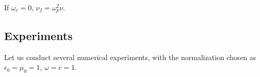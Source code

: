 \documentclass[a4paper,10pt]{article}
\begin{document}
If $\omega_c=0$, $\nu_f=\omega_p^2\nu$.













\subsection{Experiments}
Let us conduct several numerical experiments, with the normalization chosen as $\epsilon_0=\mu_0=1$, $\omega=c=1$. 
\end{document}
